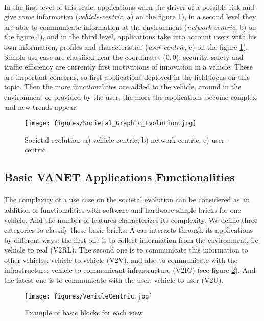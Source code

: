 \documentclass[a4paper]{article}
\begin{document}
\paragraph{}In the first level of this scale, applications warn the driver of a possible risk and give some information (\textit{vehicle-centric}, a) on the figure \ref{Function}), in a second level they are able to communicate information at the environment (\textit{network-centric}, b) on the figure \ref{Function}), and in the third level, applications take into account users with his own information, profiles and characteristics (\textit{user-centric}, c) on the figure \ref{Function}). Simple use case are classified near the coordinates ($0,0$): security, safety and traffic efficiency are currently first motivations of innovation in a vehicle. These are important concerns, so first applications deployed in the field focus on this topic. Then the more functionalities are added to the vehicle, around in the environment or provided by the user, the more the applications become complex and new trends appear. 
\begin{figure}[!htb]
\begin{center}
\texttt{[image: figures/Societal\_Graphic\_Evolution.jpg]}
\caption{Societal evolution: a) vehicle-centric, b) network-centric, c) user-centric}
\label{Function}
\end{center}
\end{figure}

\subsection{Basic VANET Applications Functionalities}

\paragraph{}The complexity of a use case on the societal evolution can be considered as an addition of functionalities with software and hardware simple bricks for one vehicle. And the number of features characterizes its complexity. We define three categories to classify these basic bricks. A car interacts through its applications by different ways: the first one is to collect information from the environment, i.e. vehicle to real (V2RL). The second one is to communicate this information to other vehicles: vehicle to vehicle (V2V), and also to communicate with the infrastructure: vehicle to communicant infrastructure (V2IC) (see figure \ref{VehicleCentric}). And the latest one is to communicate with the user: vehicle to user (V2U).
\begin{figure}[!htb]
\begin{center}
\texttt{[image: figures/VehicleCentric.jpg]}
\caption{Example of basic blocks for each view}
\label{VehicleCentric}
\end{center}
\end{figure}
\end{document}
